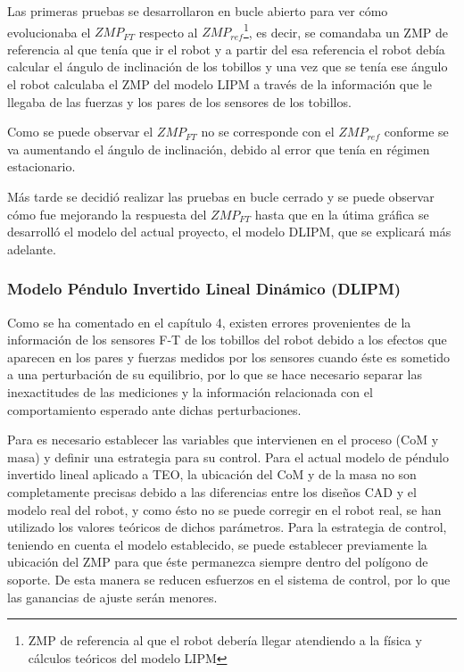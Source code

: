 Las primeras pruebas se desarrollaron en bucle abierto para ver cómo evolucionaba el $ZMP_{FT}$ respecto al $ZMP_{ref}$\footnote{ZMP de referencia al que el robot debería llegar atendiendo a la física y cálculos teóricos del modelo LIPM}, es decir, se comandaba un ZMP de referencia al que tenía que ir el robot y a  partir del esa referencia el robot debía calcular el ángulo de inclinación de los tobillos y una vez que se tenía ese ángulo el robot calculaba el ZMP del modelo LIPM a través de la información que le llegaba de las fuerzas y los pares de los sensores de los tobillos.
 
Como se puede observar el $ZMP_{FT}$ no se corresponde con el $ZMP_{ref}$ conforme se va aumentando el ángulo de inclinación, debido al error que tenía en régimen estacionario. 



Más tarde se decidió realizar las pruebas en bucle cerrado y se puede observar cómo fue mejorando la respuesta del $ZMP_{FT}$ hasta que en la útima gráfica se desarrolló el modelo del actual proyecto, el modelo DLIPM, que se explicará más adelante.



\subsubsection{Modelo Péndulo Invertido Lineal Dinámico (DLIPM)}

Como se ha comentado en el capítulo 4, existen errores provenientes de la información de los sensores F-T de los tobillos del robot debido a los efectos que aparecen en los pares y fuerzas medidos por los sensores cuando éste es sometido a una perturbación de su equilibrio, por lo que se hace necesario separar las inexactitudes de las mediciones y la información relacionada con el comportamiento esperado ante dichas perturbaciones.

Para es necesario establecer las variables que intervienen en el proceso (CoM y masa) y definir una estrategia para su control. Para el actual modelo de péndulo invertido lineal aplicado a TEO, la ubicación del CoM y de la masa no son completamente precisas debido a las diferencias entre los diseños CAD y el modelo real del robot, y como ésto no se puede corregir en el robot real, se han utilizado los valores teóricos de dichos parámetros. Para la estrategia de control, teniendo en cuenta el modelo establecido, se puede establecer previamente la ubicación del ZMP para que éste permanezca siempre dentro del polígono de soporte. De esta manera se reducen esfuerzos en el sistema de control, por lo que las ganancias de ajuste serán menores.


